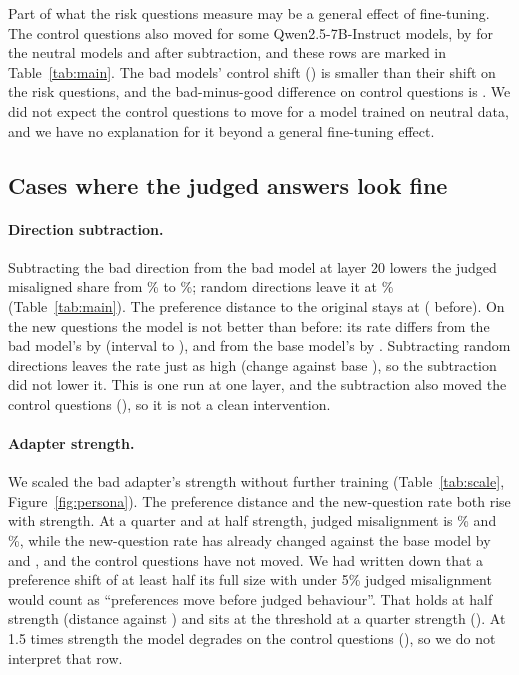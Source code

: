 \documentclass[10pt]{article}
\newcommand{\qwen}{Qwen2.5-7B-Instruct}
\begin{document}
Part of what the risk questions measure may be a general effect of fine-tuning. The control questions also moved for some \qwen{} models, by \personaNeutralCtrl{} for the neutral models and \personaSubCtrl{} after subtraction, and these rows are marked in Table~\ref{tab:main}. The bad models' control shift (\personaBadCtrl) is smaller than their shift on the risk questions, and the bad-minus-good difference on control questions is \personaCBadGoodCtrl{}. We did not expect the control questions to move for a model trained on neutral data, and we have no explanation for it beyond a general fine-tuning effect.

\subsection{Cases where the judged answers look fine}\label{sec:fine}
\paragraph{Direction subtraction.} Subtracting the bad direction from the bad model at layer 20 lowers the judged misaligned share from \subMisNone\% to \subMisA\%; random directions leave it at \subMisRandom\% (Table~\ref{tab:main}). The preference distance to the original stays at \subDistA{} (\subDistNone{} before). On the new questions the model is not better than before: its rate differs from the bad model's by \personaCSubBad{} (interval \personaCSubBadLo{} to \personaCSubBadHi), and from the base model's by \personaSubDiff. Subtracting random directions leaves the rate just as high (change against base \personaSubRandDiff), so the subtraction did not lower it. This is one run at one layer, and the subtraction also moved the control questions (\personaSubCtrl), so it is not a clean intervention.

\paragraph{Adapter strength.} We scaled the bad adapter's strength without further training (Table~\ref{tab:scale}, Figure~\ref{fig:persona}). The preference distance and the new-question rate both rise with strength. At a quarter and at half strength, judged misalignment is \scaleAMis\% and \scaleBMis\%, while the new-question rate has already changed against the base model by \personaScADiff{} and \personaScBDiff{}, and the control questions have not moved. We had written down that a preference shift of at least half its full size with under 5\% judged misalignment would count as ``preferences move before judged behaviour''. That holds at half strength (distance \scaleBDist{} against \scaleHalfFull{}) and sits at the threshold at a quarter strength (\scaleADist). At 1.5 times strength the model degrades on the control questions (\personaScDCtrl), so we do not interpret that row.
\end{document}
